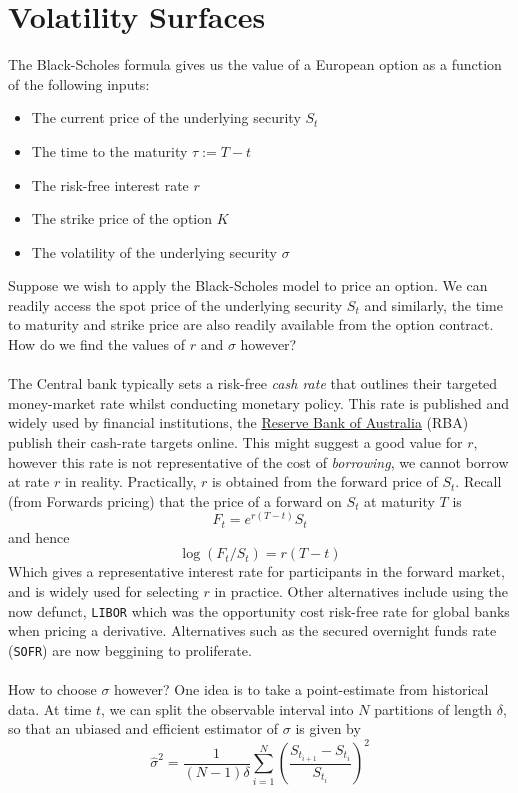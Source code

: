 \documentclass{article}
\def\code#1{\texttt{#1}}
\begin{document}
\section{Volatility Surfaces}
The Black-Scholes formula gives us the value of a European option as a function of the following inputs: \begin{itemize}
    \item The current price of the underlying security $S_t$
    \item The time to the maturity $\tau := T-t$
    \item The risk-free interest rate $r$
    \item The strike price of the option $K$
    \item The volatility of the underlying security $\sigma$
\end{itemize}
Suppose we wish to apply the Black-Scholes model to price an option. We can readily access the spot price of the underlying security $S_t$ and similarly, the time to maturity and strike price are also readily available from the option contract. How do we find the values of $r$ and $\sigma$ however? \\
\\
The Central bank typically sets a risk-free \textit{cash rate} that outlines their targeted money-market rate whilst conducting monetary policy. This rate is published and widely used by financial institutions, the \hyperlink{https://www.rba.gov.au/}{Reserve Bank of Australia} (RBA) publish their cash-rate targets online. This might suggest a good value for $r$, however this rate is not representative of the cost of \textit{borrowing}, we cannot borrow at rate $r$ in reality. Practically, $r$ is obtained from the forward price of $S_t$. Recall (from Forwards pricing) that the price of a forward on $S_t$ at maturity $T$ is 
$$F_t = e^{r(T-t)}S_t$$
and hence
$$\log(F_t/S_t) = r(T-t)$$
Which gives a representative interest rate for participants in the forward market, and is widely used for selecting $r$ in practice. Other alternatives include using the now defunct, \code{LIBOR} which was the opportunity cost risk-free rate for global banks when pricing a derivative. Alternatives such as the secured overnight funds rate (\code{SOFR}) are now beggining to proliferate.  \\
\\
How to choose $\sigma$ however? One idea is to take a point-estimate from historical data. At time $t$, we can split the observable interval into $N$ partitions of length $\delta$, so that an ubiased and efficient estimator of $\sigma$ is given by $$\hat{\sigma}^2 = \frac{1}{(N-1)\delta}\sum_{i=1}^{N}\left( \frac{S_{t_{i+1}} - S_{t_i}}{S_{t_i}}\right)^2$$
\end{document}
